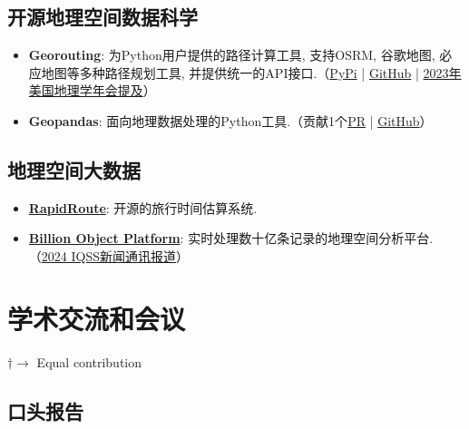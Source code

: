 \documentclass[11pt]{article}
\begin{document}
\subsection*{开源地理空间数据科学}

\begin{itemize}
	\item[] \textbf{Georouting}: 为Python用户提供的路径计算工具, 支持OSRM, 谷歌地图, 必应地图等多种路径规划工具, 并提供统一的API接口.（\href{https://pypi.org/project/georouting/}{PyPi} | \href{https://github.com/wybert/georouting}{GitHub} | \href{https://www.aag.org/wp-content/uploads/2023/03/AAG-2023-PDF-program.pdf}{2023年美国地理学年会提及}）

	\item[] \textbf{Geopandas}: 面向地理数据处理的Python工具.（贡献1个\href{https://github.com/geopandas/geopandas/pull/2658}{PR} | \href{https://github.com/geopandas/geopandas}{GitHub}）
\end{itemize}

\subsection*{地理空间大数据}

\begin{itemize}
	\item[] \textbf{\href{https://gis.harvard.edu/rapidroute}{RapidRoute}}: 开源的旅行时间估算系统.

	\item[] \textbf{\href{https://gis.harvard.edu/billion-object-platform-v20}{Billion Object Platform}}: 实时处理数十亿条记录的地理空间分析平台.（\href{https://www.iq.harvard.edu/news/cga-geospatial-infrastructure-enhancement}{2024 IQSS新闻通讯报道}）
\end{itemize}

\section*{学术交流和会议}
\label{presentations}

\vspace{-.75em}
\small
$\dagger \rightarrow$ Equal contribution
\normalsize

\subsection*{口头报告}
\label{talks}
\newrefcontext[labelprefix=T]
\printbibliography[type=misc,heading=none,resetnumbers=true,keyword=T]
\end{document}
